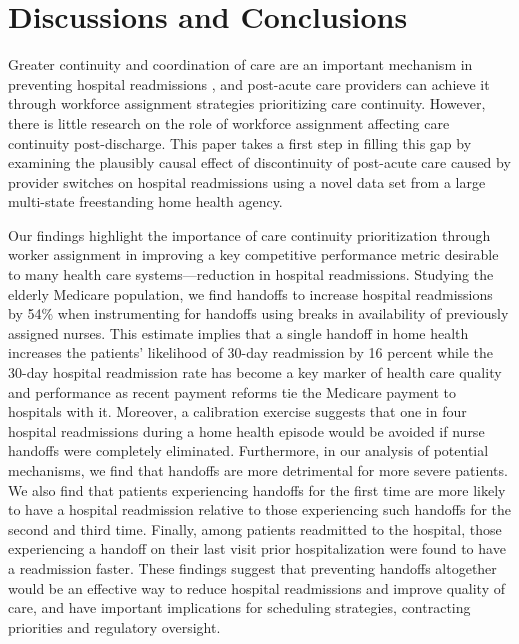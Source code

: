 \documentclass[final,12pt, notitlepage]{article}
\begin{document}


\section{Discussions and Conclusions} \label{sec:conclusion}

Greater continuity and coordination of care are an important mechanism in preventing hospital readmissions \citep{Naylor1999}, and post-acute care providers can achieve it through workforce assignment strategies prioritizing care continuity. However, there is little research on the role of workforce assignment affecting care continuity post-discharge. This paper takes a first step in filling this gap by examining the plausibly causal effect of discontinuity of post-acute care caused by provider switches on hospital readmissions using a novel data set from a large multi-state freestanding home health agency.


Our findings highlight the importance of care continuity prioritization through worker assignment in improving a key competitive performance metric desirable to many health care systems---reduction in hospital readmissions. Studying the elderly Medicare population, we find handoffs to increase hospital readmissions by 54\% when instrumenting for handoffs using breaks in availability of previously assigned nurses.
This estimate implies that a single handoff in home health increases the patients' likelihood of 30-day readmission by 16 percent while the 30-day hospital readmission rate has become a key marker of health care quality and performance as recent payment reforms tie the Medicare payment to hospitals with it.
 Moreover, a calibration exercise suggests that one in four hospital readmissions during a home health episode would be avoided if nurse handoffs were completely eliminated.
Furthermore, in our analysis of potential mechanisms, we find that handoffs are more detrimental for more severe patients. We also find that patients experiencing handoffs for the first time are more likely to have a hospital readmission relative to those experiencing such handoffs for the second and third time. Finally, among patients readmitted to the hospital, those experiencing a handoff on their last visit prior hospitalization were found to have a readmission faster.
These findings suggest that preventing handoffs altogether would be an effective way to reduce hospital readmissions and improve quality of care, and have important implications for scheduling strategies, contracting priorities and regulatory oversight.
\end{document}
